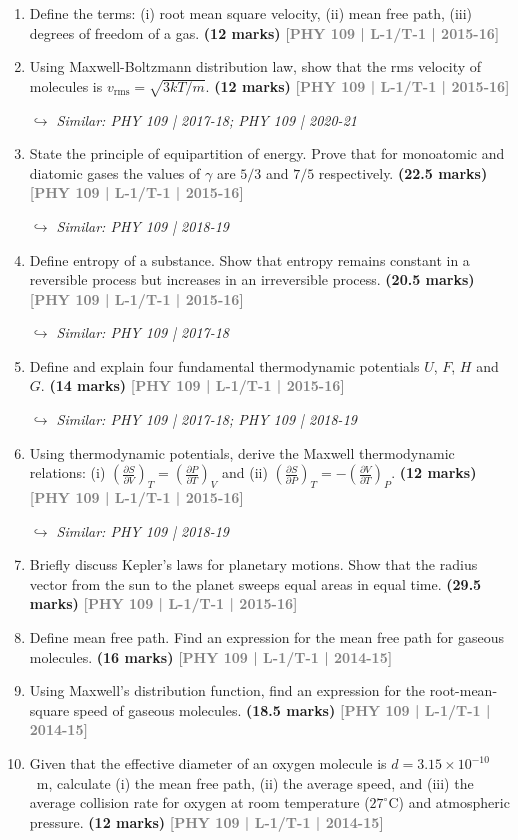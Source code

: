 \documentclass[12pt,a3paper]{article}
\newcommand{\yr}[1]{\hfill\textcolor{gray}{\small\textbf{[#1]}}}
\newcommand{\mk}[1]{\textcolor{orange!70!black}{\small\textbf{(#1 marks)}}}
\newcommand{\variant}[1]{\par\vspace{1pt}\textcolor{blue!50!black}%
  {\footnotesize\textit{$\hookrightarrow$ Similar: #1}}}
\begin{document}
\begin{enumerate}
\item Define the terms: (i) root mean square velocity, (ii) mean free path, (iii) degrees of freedom of a gas.
\mk{12} \yr{PHY 109 | L-1/T-1 | 2015-16}

\item Using Maxwell-Boltzmann distribution law, show that the rms velocity of molecules is $v_\text{rms} = \sqrt{3kT/m}$.
\mk{12} \yr{PHY 109 | L-1/T-1 | 2015-16}
\variant{PHY 109 | 2017-18; PHY 109 | 2020-21}

\item State the principle of equipartition of energy. Prove that for monoatomic and diatomic gases the values of $\gamma$ are $5/3$ and $7/5$ respectively.
\mk{22.5} \yr{PHY 109 | L-1/T-1 | 2015-16}
\variant{PHY 109 | 2018-19}

\item Define entropy of a substance. Show that entropy remains constant in a reversible process but increases in an irreversible process.
\mk{20.5} \yr{PHY 109 | L-1/T-1 | 2015-16}
\variant{PHY 109 | 2017-18}

\item Define and explain four fundamental thermodynamic potentials $U$, $F$, $H$ and $G$.
\mk{14} \yr{PHY 109 | L-1/T-1 | 2015-16}
\variant{PHY 109 | 2017-18; PHY 109 | 2018-19}

\item Using thermodynamic potentials, derive the Maxwell thermodynamic relations: (i) $\left(\frac{\partial S}{\partial V}\right)_T = \left(\frac{\partial P}{\partial T}\right)_V$ and (ii) $\left(\frac{\partial S}{\partial P}\right)_T = -\left(\frac{\partial V}{\partial T}\right)_P$.
\mk{12} \yr{PHY 109 | L-1/T-1 | 2015-16}
\variant{PHY 109 | 2018-19}

\item Briefly discuss Kepler's laws for planetary motions. Show that the radius vector from the sun to the planet sweeps equal areas in equal time.
\mk{29.5} \yr{PHY 109 | L-1/T-1 | 2015-16}

\item Define mean free path. Find an expression for the mean free path for gaseous molecules.
\mk{16} \yr{PHY 109 | L-1/T-1 | 2014-15}

\item Using Maxwell's distribution function, find an expression for the root-mean-square speed of gaseous molecules.
\mk{18.5} \yr{PHY 109 | L-1/T-1 | 2014-15}

\item Given that the effective diameter of an oxygen molecule is $d = 3.15\times10^{-10}$~m, calculate (i) the mean free path, (ii) the average speed, and (iii) the average collision rate for oxygen at room temperature ($27^\circ$C) and atmospheric pressure.
\mk{12} \yr{PHY 109 | L-1/T-1 | 2014-15}


\end{enumerate}
\end{document}
